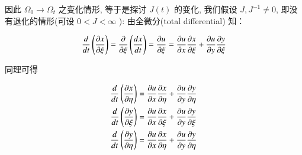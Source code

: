 \documentclass[11pt]{article}
\begin{document}
因此 ${\Omega _0} \to {\Omega _t}$ 之变化情形, 等于是探讨 $ J\left(t\right) $ 的变化, 我们假设 $ J,J^{-1} \ne 0 $, 即没有退化的情形(可设 $ 0 < J < \infty $ ): 由全微分(total differential) 知：

\begin{equation}
\frac{d}{{dt}}\left( {\frac{{\partial x}}{{\partial \xi }}} \right) = \frac{\partial }{{\partial \xi }}\left( {\frac{{dx}}{{dt}}} \right) = \frac{{\partial u}}{{\partial \xi }} = \frac{{\partial u}}{{\partial x}}\frac{{\partial x}}{{\partial \xi }} + \frac{{\partial u}}{{\partial y}}\frac{{\partial y}}{{\partial \xi }}
\notag 
\end{equation}

同理可得

\begin{equation}
\begin{split}
\frac{d}{{dt}}\left( {\frac{{\partial x}}{{\partial \eta }}} \right) & = \frac{{\partial u}}{{\partial x}}\frac{{\partial x}}{{\partial \eta }} + \frac{{\partial u}}{{\partial y}}\frac{{\partial y}}{{\partial \eta }}\\
\frac{d}{{dt}}\left( {\frac{{\partial y}}{{\partial \xi }}} \right) & = \frac{{\partial u}}{{\partial x}}\frac{{\partial x}}{{\partial \xi }} + \frac{{\partial u}}{{\partial y}}\frac{{\partial y}}{{\partial \xi }} \\
\frac{d}{{dt}}\left( {\frac{{\partial y}}{{\partial \eta }}} \right) & = \frac{{\partial u}}{{\partial x}}\frac{{\partial x}}{{\partial \eta }} + \frac{{\partial u}}{{\partial y}}\frac{{\partial y}}{{\partial \eta }}
\end{split}
\notag 
\end{equation}
\end{document}
